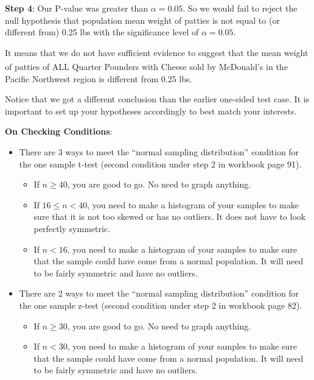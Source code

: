 \documentclass[12pt]{article}
\begin{document}
\noindent \textbf{Step 4}: Our P-value was greater than $\alpha = 0.05$. So we would fail to reject the null hypothesis that population mean weight of patties is not equal to (or different from) 0.25 lbs with the significance level of $\alpha = 0.05$. 

It means that we do not have sufficient evidence to suggest that the mean weight of patties of ALL Quarter Pounders\textsuperscript{\textregistered} with Cheese sold by McDonald's in the Pacific Northwest region is different from 0.25 lbs.

Notice that we got a different conclusion than the earlier one-sided test case. It is important to set up your hypotheses accordingly to best match your interests.

\vspace{20 pt}

\textbf{On Checking Conditions}:
\begin{itemize}
	\item There are 3 ways to meet the ``normal sampling distribution'' condition for the one sample t-test (second condition under step 2 in workbook page 91).
	\begin{itemize}
		\item If $n \geq 40$, you are good to go. No need to graph anything.
		\item If $16 \leq n < 40$, you need to make a histogram of your samples to make sure that it is not too skewed or has no outliers. It does not have to look perfectly symmetric.
		\item If $n < 16$, you need to make a histogram of your samples to make sure that the sample could have come from a normal population. It will need to be fairly symmetric and have no outliers.
	\end{itemize}
	\item There are 2 ways to meet the ``normal sampling distribution'' condition for the one sample z-test (second condition under step 2 in workbook page 82).
	\begin{itemize}
		\item If $n \geq 30$, you are good to go. No need to graph anything.
		\item If $n < 30$, you need to make a histogram of your samples to make sure that the sample could have come from a normal population. It will need to be fairly symmetric and have no outliers.
	\end{itemize}
\end{itemize}

\pagebreak
\end{document}
